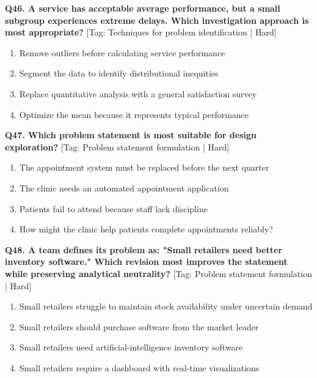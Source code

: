 \noindent\textbf{Q46. A service has acceptable average performance, but a small subgroup experiences extreme delays. Which investigation approach is most appropriate?} \hfill [Tag: Techniques for problem identification | Hard]
\begin{enumerate}[label=(\alph*),topsep=2pt,itemsep=1pt,partopsep=0pt,parsep=0pt]
    \item {Remove outliers before calculating service performance}
    \item {Segment the data to identify distributional inequities}
    \item {Replace quantitative analysis with a general satisfaction survey}
    \item {Optimize the mean because it represents typical performance}
\end{enumerate}
\vspace{2mm}

\noindent\textbf{Q47. Which problem statement is most suitable for design exploration?} \hfill [Tag: Problem statement formulation | Hard]
\begin{enumerate}[label=(\alph*),topsep=2pt,itemsep=1pt,partopsep=0pt,parsep=0pt]
    \item {The appointment system must be replaced before the next quarter}
    \item {The clinic needs an automated appointment application}
    \item {Patients fail to attend because staff lack discipline}
    \item {How might the clinic help patients complete appointments reliably?}
\end{enumerate}
\vspace{2mm}

\noindent\textbf{Q48. A team defines its problem as: "Small retailers need better inventory software." Which revision most improves the statement while preserving analytical neutrality?} \hfill [Tag: Problem statement formulation | Hard]
\begin{enumerate}[label=(\alph*),topsep=2pt,itemsep=1pt,partopsep=0pt,parsep=0pt]
    \item {Small retailers struggle to maintain stock availability under uncertain demand}
    \item {Small retailers should purchase software from the market leader}
    \item {Small retailers need artificial-intelligence inventory software}
    \item {Small retailers require a dashboard with real-time visualizations}
\end{enumerate}
\vspace{2mm}

